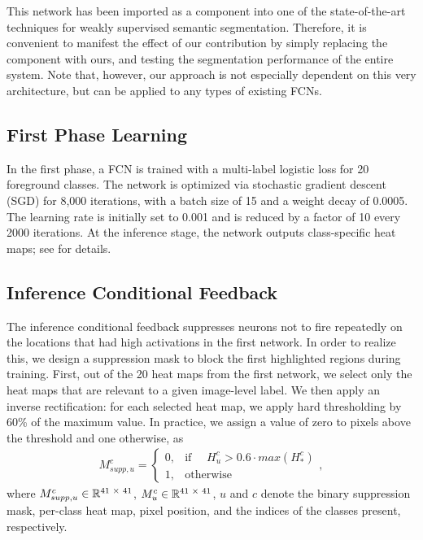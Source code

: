 \documentclass[10pt,twocolumn,letterpaper]{article}
\begin{document}
This network has been imported as a component into one of the state-of-the-art techniques for weakly supervised semantic segmentation. Therefore, it is convenient to manifest the effect of our contribution by simply replacing the component with ours, and testing the segmentation performance of the entire system. Note that, however, our approach is not especially dependent on this very architecture, but can be applied to any types of existing FCNs.

\subsection{First Phase Learning}
In the first phase, a FCN is trained with a multi-label logistic loss for 20 foreground classes. The network is optimized via stochastic gradient descent (SGD) for 8,000 iterations, with a batch size of 15 and a weight decay of 0.0005. The learning rate is initially set to 0.001 and is reduced by a factor of 10 every 2000 iterations. At the inference stage, the network outputs class-specific heat maps; see \cite{zhou2016cvpr} for details.


\subsection{Inference Conditional Feedback}
The inference conditional feedback suppresses neurons not to fire repeatedly on the locations that had high activations in the first network. In order to realize this, we design a suppression mask to block the first highlighted regions during training. First, out of the 20 heat maps from the first network, we select only the heat maps that are relevant to a given image-level label. We then apply an inverse rectification: for each selected heat map, we apply hard thresholding by 60\% of the maximum value. In practice, we assign a value of zero to pixels above the threshold and one otherwise, as
\begin{eqnarray}
   M_{supp,u}^{c} =
\begin{cases}
    0,& \text{if }  \quad H_{u}^{c} > 0.6 \cdot max(H_{*}^{c})\\
    1,              & \text{otherwise}
\end{cases},
\label{eq:binary_sup_mask}
\end{eqnarray}
where $M_{supp,u}^{c} \in \mathbb{R} \textsuperscript{41 $\times$ 41}$,  $M_{u}^{c}\in \mathbb{R} \textsuperscript{41 $\times$ 41}$, $u$ and $c$ denote the binary suppression mask, per-class heat map, pixel position, and the indices of the classes present, respectively.
\end{document}
